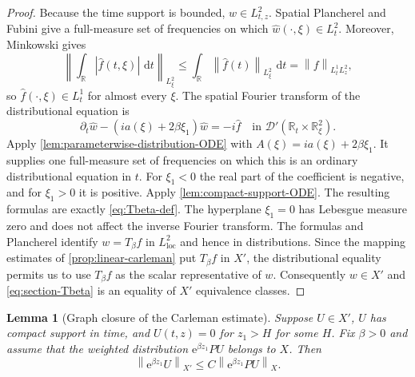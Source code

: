 \documentclass[11pt,oneside]{book}
\newtheorem{lemma}[theorem]{Lemma}
\theoremstyle{definition}
\theoremstyle{remark}
\newcommand{\R}{\mathbb R}
\newcommand{\D}{\mathcal D}
\newcommand{\1}{\mathbf 1}
\newcommand{\loc}{\mathrm{loc}}
\newcommand{\dd}{\,\mathrm d}
\newcommand{\norm}[1]{\left\lVert #1\right\rVert}
\newcommand{\e}{\mathrm e}
\begin{document}
\begin{proof}
Because the time support is bounded,
$w\in L^2_{t,z}$.  Spatial Plancherel and Fubini give a full-measure set of
frequencies on which $\widehat w(\cdot,\xi)\in L^2_t$.  Moreover,
Minkowski gives
\[
 \left\|\int_\R|\widehat f(t,\xi)|\,\dd t\right\|_{L^2_\xi}
 \le\int_\R\norm{\widehat f(t)}_{L^2_\xi}\,\dd t
 =\norm f_{L^1_tL^2_z},
\]
so $\widehat f(\cdot,\xi)\in L^1_t$ for almost every $\xi$.
The spatial Fourier transform of the distributional equation is
\[
 \partial_t\widehat w
 -(ia(\xi)+2\beta\xi_1)\widehat w
 =-i\widehat f
 \quad\text{in }\D'(\R_t\times\R^2_\xi).
\]
Apply \cref{lem:parameterwise-distribution-ODE} with
$A(\xi)=ia(\xi)+2\beta\xi_1$.  It supplies one full-measure set of
frequencies on which this is an ordinary distributional equation in $t$.
For $\xi_1<0$ the real part of the coefficient is negative, and for
$\xi_1>0$ it is positive.  Apply \cref{lem:compact-support-ODE}.  The
resulting formulas are exactly \eqref{eq:Tbeta-def}.  The hyperplane
$\xi_1=0$ has Lebesgue measure zero and does not affect the inverse Fourier
transform.  The formulas and Plancherel identify $w=T_\beta f$ in
$L^2_{\loc}$ and hence in distributions.  Since the mapping estimates of
\cref{prop:linear-carleman} put $T_\beta f$ in $X'$, the distributional
equality permits us to use $T_\beta f$ as the scalar representative of
$w$.  Consequently $w\in X'$ and \eqref{eq:section-Tbeta} is an equality
of $X'$ equivalence classes.
\end{proof}

\begin{lemma}[Graph closure of the Carleman estimate]\label{lem:carleman-closure}
Suppose $U\in X'$, $U$ has compact support in time, and
$U(t,z)=0$ for $z_1>H$ for some $H$.  Fix $\beta>0$ and assume that the
weighted distribution $\e^{\beta z_1}PU$ belongs to $X$.  Then
\begin{equation}
 \norm{\e^{\beta z_1}U}_{X'}
 \le C\norm{\e^{\beta z_1}PU}_{X}.                \label{eq:graph-carleman}
\end{equation}
\end{lemma}
\end{document}
